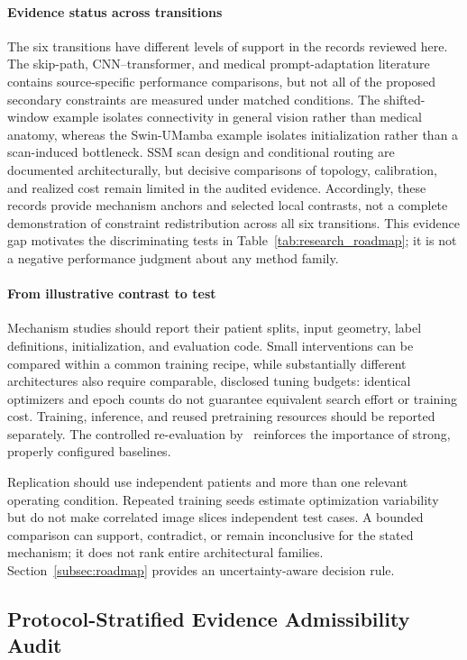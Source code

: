 \documentclass[5p,times,authoryear]{elsarticle}
\begin{document}
\paragraph{Evidence status across transitions}
The six transitions have different levels of support in the records reviewed here. The skip-path, CNN--transformer, and medical prompt-adaptation literature contains source-specific performance comparisons, but not all of the proposed secondary constraints are measured under matched conditions. The shifted-window example isolates connectivity in general vision rather than medical anatomy, whereas the Swin-UMamba example isolates initialization rather than a scan-induced bottleneck. SSM scan design and conditional routing are documented architecturally, but decisive comparisons of topology, calibration, and realized cost remain limited in the audited evidence. Accordingly, these records provide mechanism anchors and selected local contrasts, not a complete demonstration of constraint redistribution across all six transitions. This evidence gap motivates the discriminating tests in Table~\ref{tab:research_roadmap}; it is not a negative performance judgment about any method family.

\paragraph{From illustrative contrast to test}
Mechanism studies should report their patient splits, input geometry, label definitions, initialization, and evaluation code. Small interventions can be compared within a common training recipe, while substantially different architectures also require comparable, disclosed tuning budgets: identical optimizers and epoch counts do not guarantee equivalent search effort or training cost. Training, inference, and reused pretraining resources should be reported separately. The controlled re-evaluation by~\citet{isensee2024nnunetrevisited} reinforces the importance of strong, properly configured baselines.

Replication should use independent patients and more than one relevant operating condition. Repeated training seeds estimate optimization variability but do not make correlated image slices independent test cases. A bounded comparison can support, contradict, or remain inconclusive for the stated mechanism; it does not rank entire architectural families. Section~\ref{subsec:roadmap} provides an uncertainty-aware decision rule.
\subsection{Protocol-Stratified Evidence Admissibility Audit}
\label{subsec:tradeoff_decomp}
\end{document}
